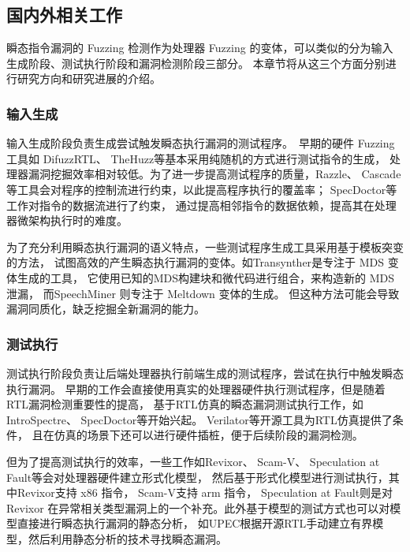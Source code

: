 \subsection{国内外相关工作}

瞬态指令漏洞的 Fuzzing 检测作为处理器 Fuzzing 的变体，可以类似的分为输入生成阶段、测试执行阶段和漏洞检测阶段三部分。
本章节将从这三个方面分别进行研究方向和研究进展的介绍。

\subsubsection{输入生成}
输入生成阶段负责生成尝试触发瞬态执行漏洞的测试程序。\
早期的硬件 Fuzzing 工具如 DifuzzRTL\cite{hur2021difuzzrtl}、
TheHuzz\cite{kande2022thehuzz}等基本采用纯随机的方式进行测试指令的生成，
处理器漏洞挖掘效率相对较低。为了进一步提高测试程序的质量，Razzle\cite{razzle}、
Cascade\cite{soltcascade}等工具会对程序的控制流进行约束，以此提高程序执行的覆盖率；
SpecDoctor\cite{hur2022specdoctor}等工作对指令的数据流进行了约束，
通过提高相邻指令的数据依赖，提高其在处理器微架构执行时的难度。\par

为了充分利用瞬态执行漏洞的语义特点，一些测试程序生成工具采用基于模板突变的方法，
试图高效的产生瞬态执行漏洞的变体。如Transynther\cite{moghimi2020medusa}是专注于 MDS 变体生成的工具，
它使用已知的MDS构建块和微代码进行组合，来构造新的 MDS 泄漏，
而SpeechMiner \cite{xiao2019speechminer}则专注于 Meltdown 变体的生成。
但这种方法可能会导致漏洞同质化，缺乏挖掘全新漏洞的能力。\par

\subsubsection{测试执行}

测试执行阶段负责让后端处理器执行前端生成的测试程序，尝试在执行中触发瞬态执行漏洞。
早期的工作会直接使用真实的处理器硬件执行测试程序，但是随着RTL漏洞检测重要性的提高，
基于RTL仿真的瞬态漏洞测试执行工作，如IntroSpectre\cite{ghaniyoun2021introspectre}、
SpecDoctor\cite{hur2022specdoctor}等开始兴起。
Verilator\cite{snyder2013verilator}等开源工具为RTL仿真提供了条件，
且在仿真的场景下还可以进行硬件插桩，便于后续阶段的漏洞检测。\par

但为了提高测试执行的效率，一些工作如Revixor\cite{oleksenko2022revizor}、
Scam-V\cite{nemati2020validation}、
Speculation at Fault\cite{hofmann2023speculation}等会对处理器硬件建立形式化模型，
然后基于形式化模型进行测试执行，其中Revixor\cite{oleksenko2022revizor}支持 x86 指令，
Scam-V\cite{hofmann2023speculation}支持 arm 指令，
Speculation at Fault\cite{hofmann2023speculation}则是对Revixor\cite{oleksenko2022revizor}
在异常相关类型漏洞上的一个补充。此外基于模型的测试方式也可以对模型直接进行瞬态执行漏洞的静态分析，
如UPEC\cite{fadiheh2020formal}根据开源RTL手动建立有界模型，然后利用静态分析的技术寻找瞬态漏洞。

